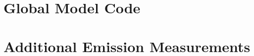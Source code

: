 \documentclass[12pt]{./tex/thesis-umich}
\begin{document}
    \chapter{Global Model Code}\label{chp:crammer}
      

    \chapter{Additional Emission Measurements}\label{chp:extraem}
      

  
  \begingroup
    \printbibliography
  \endgroup
\end{document}
